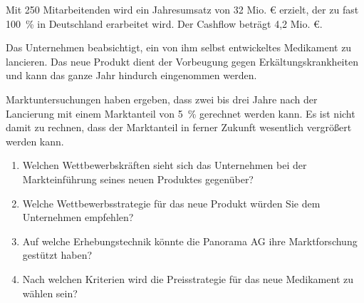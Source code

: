 Mit 250 Mitarbeitenden wird ein Jahresumsatz von 32 Mio. € erzielt, der zu fast 100~\% in Deutschland erarbeitet wird. Der Cashflow beträgt 4,2 Mio. €.

Das Unternehmen beabsichtigt, ein von ihm selbst entwickeltes Medikament zu lancieren. Das neue Produkt dient der Vorbeugung gegen Erkältungskrankheiten und kann das ganze Jahr hindurch eingenommen werden.

Marktuntersuchungen haben ergeben, dass zwei bis drei Jahre nach der Lancierung mit einem Marktanteil von 5~\% gerechnet werden kann. Es ist nicht damit zu rechnen, dass der Marktanteil in ferner Zukunft wesentlich vergrößert werden kann.

\begin{enumerate}[label=(\alph*)]
    \item Welchen Wettbewerbskräften sieht sich das Unternehmen bei der Markteinführung seines neuen Produktes gegenüber?
    \item Welche Wettbewerbsstrategie für das neue Produkt würden Sie dem Unternehmen empfehlen?
    \item Auf welche Erhebungstechnik könnte die Panorama AG ihre Marktforschung gestützt haben?
    \item Nach welchen Kriterien wird die Preisstrategie für das neue Medikament zu wählen sein?
\end{enumerate}

